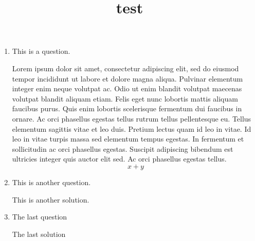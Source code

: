 \documentclass[12pt, letterpaper,answers]{worksheet}
\title{test}
\begin{document}
\maketitle

\begin{enumerate}
  \item This is a question.
  \begin{solutionbox}{3in}
    Lorem ipsum dolor sit amet, consectetur adipiscing elit, sed do eiusmod tempor incididunt ut labore et dolore magna aliqua. Pulvinar elementum integer enim neque volutpat ac. Odio ut enim blandit volutpat maecenas volutpat blandit aliquam etiam. Felis eget nunc lobortis mattis aliquam faucibus purus. Quis enim lobortis scelerisque fermentum dui faucibus in ornare. Ac orci phasellus egestas tellus rutrum tellus pellentesque eu. Tellus elementum sagittis vitae et leo duis. Pretium lectus quam id leo in vitae. Id leo in vitae turpis massa sed elementum tempus egestas. In fermentum et sollicitudin ac orci phasellus egestas. Suscipit adipiscing bibendum est ultricies integer quis auctor elit sed. Ac orci phasellus egestas tellus.
    \[x + y\]
  \end{solutionbox}
  \item This is another question.
  \begin{solutionbox}{3in}
    This is another solution.
  \end{solutionbox}
  \newpage
  \item The last question
  \begin{solutionbox}{3in}
    The last solution
  \end{solutionbox}
\end{enumerate}
\end{document}
